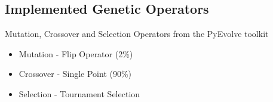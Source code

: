 \documentclass[compress]{beamer}
\begin{document}
\subsection{Implemented Genetic Operators}
\begin{frame}[fragile]{Mutation, Crossover and Selection}
  Operators from the PyEvolve toolkit
  \begin{itemize}
    \item Mutation - Flip Operator (2\%)
    \item Crossover - Single Point (90\%)
    \item Selection - Tournament Selection
  \end{itemize}
\end{frame}
\end{document}
